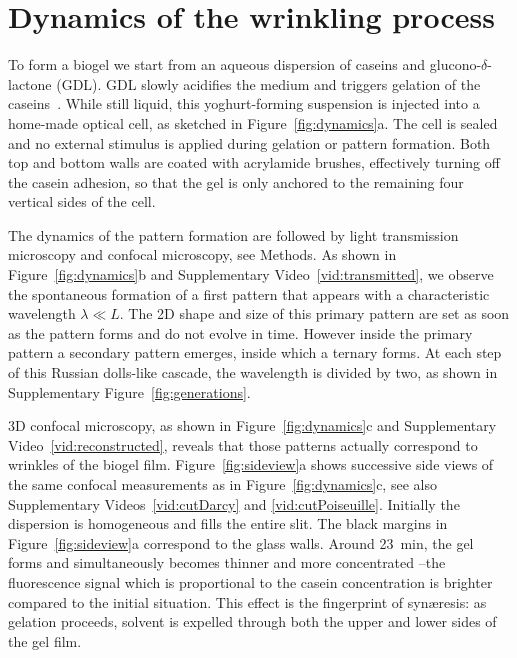 \documentclass[twocolumn,superscriptaddress,showpacs,preprintnumbers,
amsmath,amssymb,prl]{revtex4-1}
\begin{document}
\section*{Dynamics of the wrinkling process}

To form a biogel we start from an aqueous dispersion of caseins and glucono-$\delta$-lactone (GDL). GDL slowly acidifies the medium and triggers gelation of the caseins~\cite{Roefs1986,Bremer1989,Lucey1998,Dickinson2002}. While still liquid, this yoghurt-forming suspension is injected into a home-made optical cell, as sketched in Figure~\ref{fig:dynamics}a. The cell is sealed and no external stimulus is applied during gelation or pattern formation. Both top and bottom walls are coated with acrylamide brushes, effectively turning off the casein adhesion, so that the gel is only anchored to the remaining four vertical sides of the cell.

The dynamics of the pattern formation are followed by light transmission microscopy and confocal microscopy, see Methods. As shown in Figure~\ref{fig:dynamics}b and Supplementary Video~\ref{vid:transmitted}, we observe the spontaneous formation of a first pattern that appears with a characteristic wavelength $\lambda\ll L$. The 2D shape and size of this primary pattern are set as soon as the pattern forms and do not evolve in time. However inside the primary pattern a secondary pattern emerges, inside which a ternary forms. At each step of this Russian dolls-like cascade, the wavelength is divided by two, as shown in Supplementary Figure~\ref{fig:generations}.

3D confocal microscopy, as shown in Figure~\ref{fig:dynamics}c and Supplementary Video~\ref{vid:reconstructed}, reveals that those patterns actually correspond to wrinkles of the biogel film. Figure~\ref{fig:sideview}a shows successive side views of the same confocal measurements as in  Figure~\ref{fig:dynamics}c, see also Supplementary Videos~\ref{vid:cutDarcy} and \ref{vid:cutPoiseuille}. Initially the dispersion is homogeneous and fills the entire slit. The black margins in Figure~\ref{fig:sideview}a correspond to the glass walls. Around \SI{23}{\minute}, the gel forms and simultaneously becomes thinner and more concentrated --the fluorescence signal which is proportional to the casein concentration is brighter compared to the initial situation. This effect is the fingerprint of syn\ae{}resis: as gelation proceeds, solvent is expelled through both the upper and lower sides of the gel film.
\end{document}
